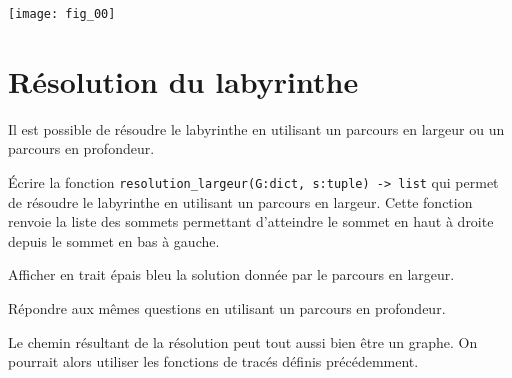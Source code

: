 \begin{marginfigure}
\texttt{[image: fig\_00]}
\end{marginfigure}



\section*{Résolution du labyrinthe}

Il est possible de résoudre le labyrinthe en utilisant un parcours en largeur ou un parcours en profondeur.

\begin{question} Écrire la fonction \lstinline{resolution_largeur(G:dict, s:tuple) -> list} qui permet de résoudre le labyrinthe en utilisant un parcours en largeur. Cette fonction renvoie la liste des sommets permettant d’atteindre le sommet en haut à droite depuis le sommet en bas à gauche.
\end{question}

\begin{question}
Afficher en trait épais bleu la solution donnée par le parcours en largeur.
\end{question}

\begin{question}
Répondre aux mêmes questions en utilisant un parcours en profondeur.
\end{question}


\begin{rem}
Le chemin résultant de la résolution peut tout aussi bien être un graphe. On pourrait alors utiliser les fonctions de tracés définis précédemment.

\end{rem}
